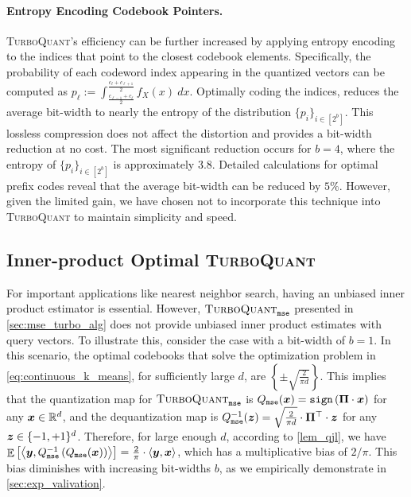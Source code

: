 \documentclass[11pt]{article}
\newcommand{\TurboQuant}{\textsc{TurboQuant}\xspace}
\begin{document}
\paragraph{Entropy Encoding Codebook Pointers.}
\TurboQuant's efficiency can be further increased by applying entropy encoding to the indices that point to the closest codebook elements. 
Specifically, the probability of each codeword index appearing in the quantized vectors can be computed as $p_\ell := \int_{\frac{c_{\ell-1} + c_\ell}{2}}^{\frac{c_\ell + c_{\ell+1}}{2}} f_X(x)~dx$.
Optimally coding the indices, reduces the average bit-width to nearly the entropy of the distribution $\{ p_i \}_{i \in [2^b]}$.
This lossless compression does not affect the distortion and provides a bit-width reduction at no cost.
The most significant reduction occurs for $b=4$, where the entropy of $\{ p_i \}_{i \in [2^b]}$ is approximately $3.8$.
Detailed calculations for optimal prefix codes reveal that the average bit-width can be reduced by $5 \%$.
However, given the limited gain, we have chosen not to incorporate this technique into \TurboQuant to maintain simplicity and speed.




\subsection{Inner-product Optimal \TurboQuant} \label{sec:prod_turbo_alg}
For important applications like nearest neighbor search, having an unbiased inner product estimator is essential.
However, $\TurboQuant_{\tt mse}$ presented in \cref{sec:mse_turbo_alg} does not provide unbiased inner product estimates with query vectors.
To illustrate this, consider the case with a bit-width of $b=1$.
In this scenario, the optimal codebooks that solve the optimization problem in \cref{eq:continuous_k_means}, for sufficiently large $d$, are $\left\{ \pm \sqrt{\frac{2}{\pi d}} \right\}$. 
This implies that the quantization map for $\TurboQuant_{\tt mse}$ is $Q_{\tt mse}({\bm x}) = {\tt sign} \left( \boldsymbol{\Pi} \cdot {\bm x} \right)$ for any ${\bm x} \in \mathbb{R}^d$, and the dequantization map is $Q_{\tt mse}^{-1}({\bm z}) = \sqrt{\frac{2}{\pi d}} \cdot \boldsymbol{\Pi}^\top \cdot {\bm z}$ for any ${\bm z} \in \{ -1, +1\}^d$. 
Therefore, for large enough $d$, according to \cref{lem_qjl}, we have $\mathop{{\mathbb{E}}}\left[ \left< {\bm y}, Q_{\tt mse}^{-1}\left( Q_{\tt mse}({\bm x}) \right) \right> \right] = \frac{2}{\pi} \cdot \langle {\bm y}, {\bm x} \rangle$, which has a multiplicative bias of $2/\pi$.
This bias diminishes with increasing bit-widths $b$, as we empirically demonstrate in \cref{sec:exp_valivation}.
\end{document}
